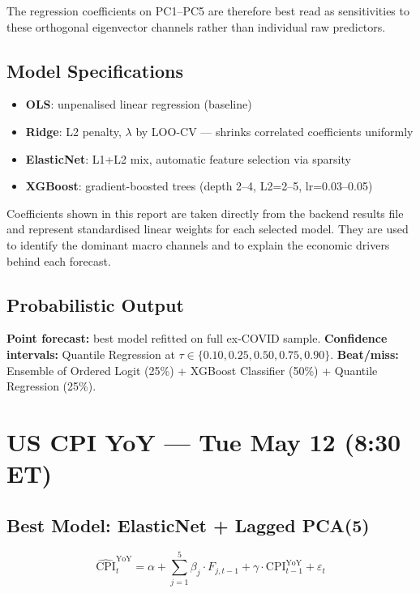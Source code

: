 \documentclass[11pt,a4paper]{article}
\begin{document}
The regression coefficients on PC1--PC5 are therefore best read as sensitivities to these orthogonal eigenvector channels rather than individual raw predictors.

\subsection*{Model Specifications}
\begin{itemize}[nosep, leftmargin=1.2em]
    \item \textbf{OLS}: unpenalised linear regression (baseline)
    \item \textbf{Ridge}: L2 penalty, $\lambda$ by LOO-CV --- shrinks correlated coefficients uniformly
    \item \textbf{ElasticNet}: L1+L2 mix, automatic feature selection via sparsity
    \item \textbf{XGBoost}: gradient-boosted trees (depth 2--4, L2=2--5, lr=0.03--0.05)
\end{itemize}

Coefficients shown in this report are taken directly from the backend results file and represent standardised linear weights for each selected model. They are used to identify the dominant macro channels and to explain the economic drivers behind each forecast.

\subsection*{Probabilistic Output}
\textbf{Point forecast:} best model refitted on full ex-COVID sample.
\textbf{Confidence intervals:} Quantile Regression at $\tau \in \{0.10, 0.25, 0.50, 0.75, 0.90\}$.
\textbf{Beat/miss:} Ensemble of Ordered Logit (25\%) + XGBoost Classifier (50\%) + Quantile Regression (25\%).

\newpage

\section*{US CPI YoY --- Tue May 12 (8:30 ET)}

\subsection*{Best Model: ElasticNet + Lagged PCA(5)}
\vspace{-0.2cm}
$$\widehat{\text{CPI}}_t^{\text{YoY}} = \alpha + \sum_{j=1}^{5} \beta_j \cdot F_{j,t-1} + \gamma \cdot \text{CPI}_{t-1}^{\text{YoY}} + \varepsilon_t$$
\end{document}
